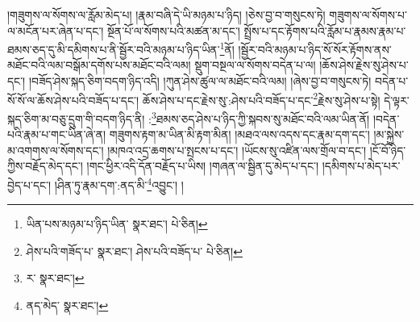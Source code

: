 །གཟུགས་ལ་སོགས་ལ་རློམ་མེད་པ། །རྣམ་བཞི་དེ་ཡི་མཉམ་པ་ཉིད། །ཅེས་བྱ་བ་གསུངས་ཏེ། གཟུགས་ལ་སོགས་པ་ལ་མངོན་པར་ཞེན་པ་དང་། སྔོན་པོ་ལ་སོགས་པའི་མཚན་མ་དང་། སྤྲོས་པ་དང་རྟོགས་པའི་རློམ་པ་རྣམས་རྣམ་པ་ཐམས་ཅད་དུ་མི་དམིགས་པ་ནི་སྦྱོར་བའི་མཉམ་པ་ཉིད་ཡིན་\footnote{ཡིན་པས་མཉམ་པ་ཉིད་ཡིན་  སྣར་ཐང་།  པེ་ཅིན། }ནོ། །སྦྱོར་བའི་མཉམ་པ་ཉིད་སོ་སོར་རྟོགས་ནས་མཐོང་བའི་ལམ་བསྒོམ་དགོས་པས་མཐོང་བའི་ལམ། སྡུག་བསྔལ་ལ་སོགས་བདེན་པ་ལ། །ཆོས་ཤེས་རྗེས་སུ་ཤེས་པ་དང་། །བཟོད་ཤེས་སྐད་ཅིག་བདག་ཉིད་འདི། །ཀུན་ཤེས་ཚུལ་ལ་མཐོང་བའི་ལམ། །ཞེས་བྱ་བ་གསུངས་ཏེ། བདེན་པ་སོ་སོ་ལ་ཆོས་ཤེས་པའི་བཟོད་པ་དང་། ཆོས་ཤེས་པ་དང་རྗེས་སུ་:ཤེས་པའི་བཟོད་པ་དང་\footnote{ཤེས་པའི་གཟོད་པ་  སྣར་ཐང་། ཤེས་པའི་བཟོད་པ་  པེ་ཅིན། }རྗེས་སུ་ཤེས་པ་སྟེ། དེ་ལྟར་སྐད་ཅིག་མ་བཅུ་དྲུག་གི་བདག་ཉིད་ནི། :\footnote{ར་  སྣར་ཐང་། }ཐམས་ཅད་ཤེས་པ་ཉིད་ཀྱི་སྐབས་སུ་མཐོང་བའི་ལམ་ཡིན་ནོ། །བདེན་པའི་རྣམ་པ་གང་ཡིན་ཞེ་ན། གཟུགས་རྟག་མ་ཡིན་མི་རྟག་མིན། །མཐའ་ལས་འདས་དང་རྣམ་དག་དང་། །མ་སྐྱེས་མ་འགགས་ལ་སོགས་དང་། །མཁའ་འདྲ་ཆགས་པ་སྤངས་པ་དང་། །ཡོངས་སུ་འཛིན་ལས་གྲོལ་བ་དང་། །ངོ་བོ་ཉིད་ཀྱིས་བརྗོད་མེད་དང་། །གང་ཕྱིར་འདི་དོན་བརྗོད་པ་ཡིས། །གཞན་ལ་སྦྱིན་དུ་མེད་པ་དང་། །དམིགས་པ་མེད་པར་བྱེད་པ་དང་། །ཤིན་ཏུ་རྣམ་དག་:ནད་མི་\footnote{ནད་མེད་  སྣར་ཐང་། }འབྱུང་། །
